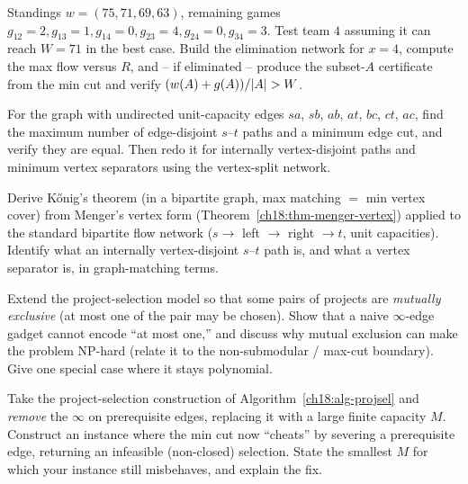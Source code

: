 \begin{exercise}
\label{ch18:ex-baseball-cert}
Standings $w = (75, 71, 69, 63)$, remaining games $g_{12}=2, g_{13}=1, g_{14}=0, g_{23}=4, g_{24}=0, g_{34}=3$. Test team $4$ assuming it can reach $W=71$ in the best case. Build the elimination network for $x=4$, compute the max flow versus $R$, and -- if eliminated -- produce the subset-$A$ certificate from the min cut and verify $(w(A)+g(A))/\lvert A\rvert > W$.
\end{exercise}

\begin{exercise}
\label{ch18:ex-menger}
For the graph with undirected unit-capacity edges $sa$, $sb$, $ab$, $at$, $bc$, $ct$, $ac$, find the maximum number of edge-disjoint $s$--$t$ paths and a minimum edge cut, and verify they are equal. Then redo it for internally vertex-disjoint paths and minimum vertex separators using the vertex-split network.
\end{exercise}

\begin{exercise}
\label{ch18:ex-konig}
Derive K\H{o}nig's theorem (in a bipartite graph, max matching $=$ min vertex cover) from Menger's vertex form (Theorem~\ref{ch18:thm-menger-vertex}) applied to the standard bipartite flow network ($s\to$ left $\to$ right $\to t$, unit capacities). Identify what an internally vertex-disjoint $s$--$t$ path is, and what a vertex separator is, in graph-matching terms.
\end{exercise}

\begin{exercise}
\label{ch18:ex-mutex}
Extend the project-selection model so that some pairs of projects are \emph{mutually exclusive} (at most one of the pair may be chosen). Show that a naive $\infty$-edge gadget cannot encode ``at most one,'' and discuss why mutual exclusion can make the problem NP-hard (relate it to the non-submodular / max-cut boundary). Give one special case where it stays polynomial.
\end{exercise}

\begin{exercise}
\label{ch18:ex-break}
Take the project-selection construction of Algorithm~\ref{ch18:alg-projsel} and \emph{remove} the $\infty$ on prerequisite edges, replacing it with a large finite capacity $M$. Construct an instance where the min cut now ``cheats'' by severing a prerequisite edge, returning an infeasible (non-closed) selection. State the smallest $M$ for which your instance still misbehaves, and explain the fix.
\end{exercise}
